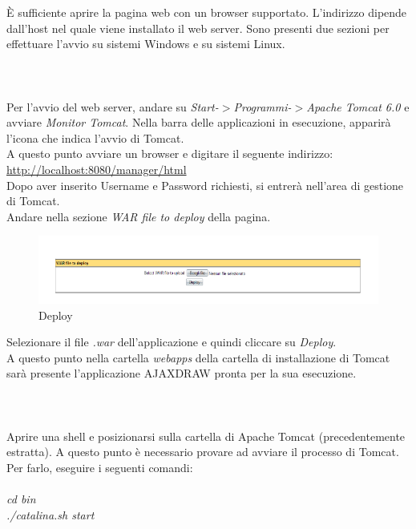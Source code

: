 \`E sufficiente aprire la pagina web con un browser supportato. L'indirizzo dipende dall'host nel quale viene installato il web server.
Sono presenti due sezioni per effettuare l'avvio su sistemi Windows e su sistemi Linux.\\ \\ \\
\\
Per l'avvio del web server, andare su \textit{Start-$ > $Programmi-$ > $Apache Tomcat 6.0} e avviare \textit{Monitor Tomcat}.
Nella barra delle applicazioni in esecuzione, apparir\`a l'icona che indica l'avvio di Tomcat.\\
A questo punto avviare un browser e digitare il seguente indirizzo:\\ 
\href{http://localhost:8080/manager/html}{http://localhost:8080/manager/html}\\
Dopo aver inserito Username e Password richiesti, si entrer\`a nell'area di gestione di Tomcat.\\
Andare nella sezione \textit{WAR file to deploy} della pagina.\\
\begin{figure}[!ht]
\centering
\includegraphics[scale=0.7]{images/DeployTomcat.png}
\caption{Deploy}
\end{figure} 

Selezionare il file \textit{.war} dell'applicazione e quindi cliccare su \textit{Deploy}.\\
A questo punto nella cartella \textit{webapps} della cartella di installazione di Tomcat sar\`a presente l'applicazione AJAXDRAW pronta per la sua esecuzione.\\ 
\\\\
\\
Aprire una shell e posizionarsi sulla cartella di Apache Tomcat (precedentemente estratta).
A questo punto \`e necessario provare ad avviare il processo di Tomcat. Per farlo, eseguire i seguenti comandi:\\
\\
\textit{cd bin}\\
\textit{./catalina.sh start}\\

